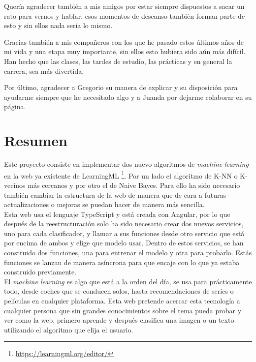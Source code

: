 \documentclass[a4paper, 12pt]{book}
\begin{document}
Quería agradecer también a mis amigos por estar siempre dispuestos a sacar un rato para vernos y hablar, esos momentos de descanso también forman parte de esto y sin ellos nada sería lo mismo.

Gracias también a mis compañeros con los que he pasado estos últimos años de mi vida y una etapa muy importante, sin ellos esto hubiera sido aún más difícil. Han hecho que las clases, las tardes de estudio, las prácticas y en general la carrera, sea más divertida.

Por último, agradecer a Gregorio su manera de explicar y su disposición para ayudarme siempre que he necesitado algo y a Juanda por dejarme colaborar en su página.



\chapter*{Resumen}

 
Este proyecto consiste en implementar dos nuevo algoritmos de \emph{machine learning} en la web ya existente de LearningML  \footnote{\url{https://learningml.org/editor/}}. Por un lado el algoritmo de K-NN o K-vecinos más cercanos y por otro el de Naive Bayes. Para ello ha sido necesario también cambiar la estructura de la web de manera que de cara a futuras actualizaciones o mejoras se puedan hacer de manera más sencilla.\\
Esta web usa el lenguaje TypeScript y está creada con Angular, por lo que después de la reestructuración solo ha sido necesario crear dos nuevos servicios, uno para cada clasificador, y llamar a sus funciones desde otro servicio que está por encima de ambos y elige que modelo usar. Dentro de estos servicios, se han construido dos funciones, una para entrenar el modelo y otra para probarlo. Estás funciones se lanzan de manera asíncrona para que encaje con lo que ya estaba construido previamente.\\
El \emph{machine learning} es algo que está a la orden del día, se usa para prácticamente todo, desde coches que se conducen solos, hasta recomendaciones de series o películas en cualquier plataforma. Esta web pretende acercar esta tecnología a cualquier persona que sin grandes conocimientos sobre el tema pueda probar y ver como la web, primero aprende y después clasifica una imagen o un texto utilizando el algoritmo que elija el usuario.
\end{document}
